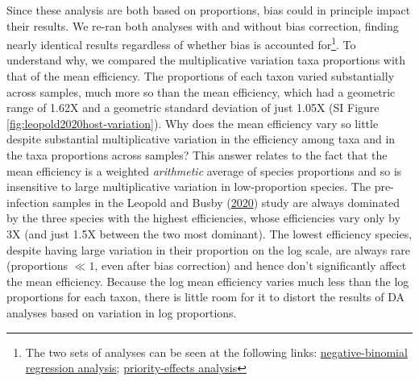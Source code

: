 \documentclass[
]{article}
\begin{document}
Since these analysis are both based on proportions, bias could in principle impact their results.
We re-ran both analyses with and without bias correction, finding nearly identical results regardless of whether bias is accounted for\footnote{The two sets of analyses can be seen at the following links: \href{https://mikemc.github.io/differential-abundance-theory/notebook/posts/2022-01-06-leopold2020host-original-regression-analysis/index.html}{negative-binomial regression analysis}; \href{https://mikemc.github.io/differential-abundance-theory/notebook/posts/2022-01-05-leopold2020host-priority-effects/index.html}{priority-effects analysis}}.
To understand why, we compared the multiplicative variation taxa proportions with that of the mean efficiency.
The proportions of each taxon varied substantially across samples, much more so than the mean efficiency, which had a geometric range of 1.62X and a geometric standard deviation of just 1.05X (SI Figure \ref{fig:leopold2020host-variation}).
Why does the mean efficiency vary so little despite substantial multiplicative variation in the efficiency among taxa and in the taxa proportions across samples?
This answer relates to the fact that the mean efficiency is a weighted \emph{arithmetic} average of species proportions and so is insensitive to large multiplicative variation in low-proportion species.
The pre-infection samples in the Leopold and Busby (\protect\hyperlink{ref-leopold2020host}{2020}) study are always dominated by the three species with the highest efficiencies, whose efficiencies vary only by 3X (and just 1.5X between the two most dominant).
The lowest efficiency species, despite having large variation in their proportion on the log scale, are always rare (proportions \(\ll 1\), even after bias correction) and hence don't significantly affect the mean efficiency.
Because the log mean efficiency varies much less than the log proportions for each taxon, there is little room for it to distort the results of DA analyses based on variation in log proportions.
\end{document}
